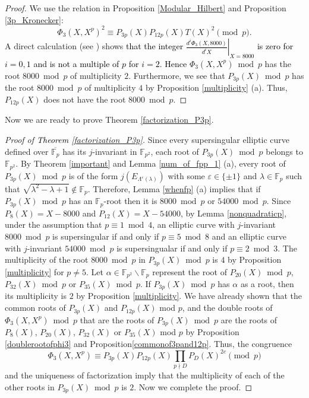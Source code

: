 \documentclass[a4paper, 11pt]{article}
\theoremstyle{plain}
\newcommand{\?}{\textcolor{red}{??}}
\newcommand{\lm}{\lambda}
\newcommand{\Lm}{\Lambda}
\newcommand{\fp}{\mathbb{F}_p}
\newcommand{\fpp}{\mathbb{F}_{p^2}}
\begin{document}
\begin{proof}
    We use the relation in Proposition \ref{Modular_Hilbert} and Proposition \ref{3p_Kronecker}:
    \[
    \Phi_3(X,X^p)^2\equiv P_{3p}(X)P_{12p}(X)T(X)^2 \pmod p.
    \]
    A direct calculation (see \cite[16]{Github}) %
    shows \textcolor{black}{that the integer $\left.\frac{d^i\Phi_3(X,8000)}{d^i X}\right|_{X=8000}$ is zero for $i=0, 1$ and is not a multiple of $p$ for $i = 2$.  Hence} $\Phi_3(X,X^p) \bmod p$ has the root $8000 \bmod p $ of multiplicity $2$. Furthermore, we see that $P_{3p}(X) \bmod p$ has the root $8000 \bmod p $ of multiplicity $4$ by Proposition \ref{multiplicity} (a). Thus, $P_{12p}(X)$ does not have the root $8000 \bmod p$.
\end{proof}
Now we are ready to prove Theorem \ref{factorization_P3p}.
\begin{proof}[Proof of \textcolor{black}{Theorem} \ref{factorization_P3p}]
Since every supersingular elliptic curve defined over $\overline{\fp}$ has its $j$-invariant in $\fpp$, each root of $P_{3p}(X) \bmod p$ belongs to $\fpp$.  By Theorem \ref{important} and Lemma \ref{num_of_fpp_1} (a), every root of $P_{3p}(X) \bmod p$ is of the form $j(E_{\Lm^{\varepsilon}(\lm)})$ with some $\varepsilon\in \{\pm1\}$ and $\lm\in\fp$ such that $\sqrt{\lm^2-\lm+1}\notin \fp$.  Therefore, Lemma \ref{whenfp} (a) implies that if $P_{3p}(X)\bmod p$ has an $\fp$-root then it is $8000 \bmod p $ or $54000 \bmod p$. Since $P_{8}(X)=X-8000$ and $P_{12}(X)=X-54000$, by Lemma \ref{nonquadraticp}, under the assumption that $p \equiv 1 \bmod 4$, an elliptic curve with $j$-invariant $8000 \bmod p$ is supersingular if and only if $p \equiv5\bmod 8$ and an elliptic curve with $j$-invariant $54000 \bmod p$ is supersingualar if and only if $p \equiv2\bmod 3$. The multiplicity of the root $8000 \bmod p$ in $P_{3p}(X) \bmod p$ is $4$ by Proposition \ref{multiplicity} for $p\ne 5$. Let $\alpha\in\fpp\smallsetminus\fp$ represent the root of $P_{20}(X) \bmod p$, $P_{32}(X) \bmod p$ or $P_{35}(X) \bmod p$. If $P_{3p}(X) \bmod p$ has $\alpha$ as a root, then its multiplicity is $2$ by Proposition \ref{multiplicity}.  We have already shown that the common roots of $P_{3p}(X)$ and $P_{12p}(X)$ mod $p$, and the double roots of $\Phi_3(X,X^p) \bmod p$ that are the roots of $P_{3p}(X) \bmod p$ are the roots of $P_8(X)$, $P_{20}(X)$, $P_{32}(X)$ or $P_{35}(X)$ mod $p$ by Proposition \ref{doublerootofphi3} and Proposition\ref{commonof3pand12p}.  Thus, the congruence
    \[
    \Phi_3(X,X^p) \equiv P_{3p}(X)P_{12p}(X) \prod_{p \nmid D }P_D(X)^{2e} \pmod p
    \]
    and the uniqueness of factorization imply that the multiplicity of each of the other roots in $P_{3p}(X) \bmod p$ is $2$.  Now we complete the proof.
\end{proof}
\end{document}
